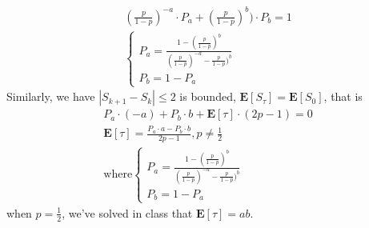 \documentclass{article}
\theoremstyle{definition}
\begin{document}
\begin{enumerate}[(a)]
\begin{equation}
			\begin{aligned}
				(\frac{p}{1-p})^{-a}\cdot P_a+(\frac{p}{1-p})^{b})\cdot P_b = 1 \\
				\begin{cases}
					P_a = \frac{1-(\frac{p}{1-p})^{b}}{(\frac{p}{1-p})^{-a}-\frac{p}{1-p})^{b}} \\
					P_b = 1-P_a
				\end{cases}
			\end{aligned}
		\end{equation}
		Similarly, we have $|S_{k+1}-S_k|\leq2$ is bounded, $\mathbf E [S_\tau] = \mathbf E [S_0]$, that is
		 \begin{equation}
		 	\begin{aligned}
		 		P_a\cdot (-a)+P_b\cdot b+\mathbf E [\tau]\cdot (2p-1) = 0 \\
				\mathbf E[\tau] = \frac{P_a\cdot a-P_b\cdot b}{2p-1}, p\neq \frac{1}{2} \\
				\text{where}
				\begin{cases}
					P_a = \frac{1-(\frac{p}{1-p})^{b}}{(\frac{p}{1-p})^{-a}-\frac{p}{1-p})^{b}} \\
					P_b = 1-P_a
				\end{cases}
		 	\end{aligned}
		 \end{equation}
	 	when $p=\frac{1}{2}$, we've solved in class that $\mathbf E[\tau] = ab$.
	\end{enumerate}
\end{document}
